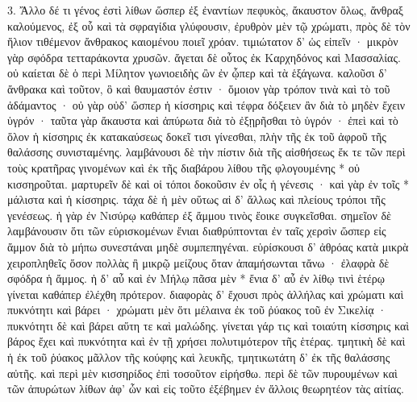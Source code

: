 \documentclass[a4paper, 11pt, oneside, polutonikogreek, german]{article}
\begin{document}
3. Ἄλλο δέ τι γένος ἐστὶ λίθων ὥσπερ ἐξ ἐναντίων πεφυκὸς, ἄκαυστον ὅλως, ἄνθραξ καλούμενος, ἐξ οὗ καὶ τὰ σφραγίδια γλύφουσιν, ἐρυθρὸν μὲν τῷ χρώματι, πρὸς δὲ τὸν ἥλιον τιθέμενον ἄνθρακος καιομένου ποιεῖ χρόαν. τιμιώτατον δ' ὡς εἰπεῖν · μικρὸν γὰρ σφόδρα τετταράκοντα χρυσῶν. ἄγεται δὲ οὗτος ἐκ Καρχηδόνος καὶ Μασσαλίας. οὐ καίεται δὲ ὁ περὶ Μίλητον γωνιοειδὴς ὢν ἐν ᾧπερ καὶ τὰ ἑξάγωνα. καλοῦσι δ' ἄνθρακα καὶ τοῦτον, ὃ καὶ θαυμαστόν ἐστιν · ὅμοιον γὰρ τρόπον τινὰ καὶ τὸ τοῦ ἀδάμαντος · οὐ γὰρ οὐδ' ὥσπερ ἡ κίσσηρις καὶ τέφρα δόξειεν ἂν διὰ τὸ μηδὲν ἔχειν ὑγρόν · ταῦτα γὰρ ἄκαυστα καὶ ἀπύρωτα διὰ τὸ ἐξῃρῆσθαι τὸ ὑγρόν · ἐπεὶ καὶ τὸ ὅλον ἡ κίσσηρις ἐκ κατακαύσεως δοκεῖ τισι γίνεσθαι, πλὴν τῆς ἐκ τοῦ ἀφροῦ τῆς θαλάσσης συνισταμένης. λαμβάνουσι δὲ τὴν πίστιν διὰ τῆς αἰσθήσεως ἔκ τε τῶν περὶ τοὺς κρατῆρας γινομένων καὶ ἐκ τῆς διαβάρου λίθου τῆς φλογουμένης * οὐ κισσηροῦται. μαρτυρεῖν δὲ καὶ οἱ τόποι δοκοῦσιν ἐν οἷς ἡ γένεσις · καὶ γὰρ ἐν τοῖς * μάλιστα καὶ ἡ κίσσηρις. τάχα δὲ ἡ μὲν οὕτως αἱ δ' ἄλλως καὶ πλείους τρόποι τῆς γενέσεως. ἡ γὰρ ἐν Νισύρῳ καθάπερ ἐξ ἄμμου τινὸς ἔοικε συγκεῖσθαι. σημεῖον δὲ λαμβάνουσιν ὅτι τῶν εὑρισκομένων ἔνιαι διαθρύπτονται ἐν ταῖς χερσὶν ὥσπερ εἰς ἄμμον διὰ τὸ μήπω συνεστάναι μηδὲ συμπεπηγέναι. εὑρίσκουσι δ' ἀθρόας κατὰ μικρὰ χειροπληθεῖς ὅσον πολλὰς ἢ μικρῷ μείζους ὅταν ἀπαμήσωνται τἄνω · ἐλαφρὰ δὲ σφόδρα ἡ ἄμμος. ἡ δ' αὖ καὶ ἐν Μήλῳ πᾶσα μὲν * ἔνια δ' αὖ ἐν λίθῳ τινὶ ἑτέρῳ γίνεται καθάπερ ἐλέχθη πρότερον. διαφορὰς δ' ἔχουσι πρὸς ἀλλήλας καὶ χρώματι καὶ πυκνότητι καὶ βάρει · χρώματι μὲν ὅτι μέλαινα ἐκ τοῦ ῤύακος τοῦ ἐν Σικελίᾳ · πυκνότητι δὲ καὶ βάρει αὕτη τε καὶ μαλώδης. γίνεται γάρ τις καὶ τοιαύτη κίσσηρις καὶ βάρος ἔχει καὶ πυκνότητα καὶ ἐν τῇ χρήσει πολυτιμότερον τῆς ἑτέρας. τμητικὴ δὲ καὶ ἡ ἐκ τοῦ ῥύακος μᾶλλον τῆς κούφης καὶ λευκῆς, τμητικωτάτη δ' ἐκ τῆς θαλάσσης αὐτῆς. καὶ περὶ μὲν κισσηρίδος ἐπὶ τοσοῦτον εἰρήσθω. περὶ δὲ τῶν πυρουμένων καὶ τῶν ἀπυρώτων λίθων ἀφ' ὧν καὶ εἰς τοῦτο ἐξέβημεν ἐν ἄλλοις θεωρητέον τὰς αἰτίας.
\end{document}
